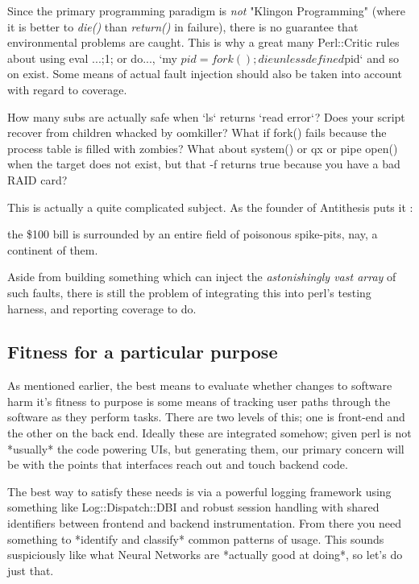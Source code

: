\documentclass{article}
\begin{document}
Since the primary programming paradigm is \textit{not} "Klingon Programming" (where it is better to \textit{die()} than \textit{return()} in failure), there is no guarantee that environmental problems are caught.
This is why a great many Perl::Critic rules about using eval {...;1;} or do..., `my $pid=fork(); die unless defined $pid` and so on exist.
Some means of actual fault injection should also be taken into account with regard to coverage.

How many subs are actually safe when `ls` returns `read error`?
Does your script recover from children whacked by oomkiller?
What if fork() fails because the process table is filled with zombies?
What about system() or qx{} or pipe open() when the target does not exist, but that -f returns true because you have a bad RAID card?

This is actually a quite complicated subject.  As the founder of Antithesis puts it \cite{antithesis}:
\begin{displayquote}
the \$100 bill is surrounded by an entire field of poisonous spike-pits, nay, a continent of them.
\end{displayquote}
Aside from building something which can inject the \textit{astonishingly vast array} of such faults, there is still the problem of integrating this into perl's testing harness, and reporting coverage to do.

\subsection{Fitness for a particular purpose}

As mentioned earlier, the best means to evaluate whether changes to software harm it's fitness to purpose is some means of tracking user paths through the software as they perform tasks.
There are two levels of this; one is front-end and the other on the back end.
Ideally these are integrated somehow; given perl is not *usually* the code powering UIs, but generating them, our primary concern will be with the points that interfaces reach out and touch backend code.

The best way to satisfy these needs is via a powerful logging framework using something like Log::Dispatch::DBI and robust session handling with shared identifiers between frontend and backend instrumentation.
From there you need something to *identify and classify* common patterns of usage.
This sounds suspiciously like what Neural Networks are *actually good at doing*, so let's do just that.
\end{document}
